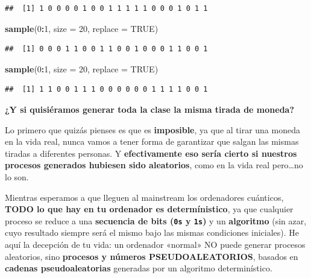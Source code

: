 \documentclass[11pt,]{book}
\newenvironment{Shaded}{\begin{snugshade}}{\end{snugshade}}
\newcommand{\DataTypeTok}[1]{\textcolor[rgb]{0.27,0.27,0.27}{#1}}
\newcommand{\DecValTok}[1]{\textcolor[rgb]{0.06,0.06,0.06}{#1}}
\newcommand{\KeywordTok}[1]{\textcolor[rgb]{0.27,0.27,0.27}{\textbf{#1}}}
\newcommand{\NormalTok}[1]{#1}
\newcommand{\OperatorTok}[1]{\textcolor[rgb]{0.43,0.43,0.43}{\textbf{#1}}}
\newcommand{\OtherTok}[1]{\textcolor[rgb]{0.37,0.37,0.37}{#1}}
\begin{document}
\begin{verbatim}
##  [1] 1 0 0 0 0 1 0 0 1 1 1 1 1 0 0 0 1 0 1 1
\end{verbatim}

\begin{Shaded}
\begin{Highlighting}[]
\KeywordTok{sample}\NormalTok{(}\DecValTok{0}\OperatorTok{:}\DecValTok{1}\NormalTok{, }\DataTypeTok{size =} \DecValTok{20}\NormalTok{, }\DataTypeTok{replace =} \OtherTok{TRUE}\NormalTok{)}
\end{Highlighting}
\end{Shaded}

\begin{verbatim}
##  [1] 0 0 0 1 1 0 0 1 1 0 0 1 0 0 0 1 1 0 0 1
\end{verbatim}

\begin{Shaded}
\begin{Highlighting}[]
\KeywordTok{sample}\NormalTok{(}\DecValTok{0}\OperatorTok{:}\DecValTok{1}\NormalTok{, }\DataTypeTok{size =} \DecValTok{20}\NormalTok{, }\DataTypeTok{replace =} \OtherTok{TRUE}\NormalTok{)}
\end{Highlighting}
\end{Shaded}

\begin{verbatim}
##  [1] 1 1 0 0 1 1 1 0 0 0 0 0 0 1 1 1 1 0 0 1
\end{verbatim}

\textbf{¿Y si quisiéramos generar toda la clase la misma tirada de moneda?}

Lo primero que quizás pienses es que es \textbf{imposible}, ya que al tirar una moneda en la vida real, nunca vamos a tener forma de garantizar que salgan las mismas tiradas a diferentes personas. Y \textbf{efectivamente eso sería cierto si nuestros procesos generados hubiesen sido aleatorios}, como en la vida real pero\ldots{}no lo son.

Mientras esperamos a que lleguen al mainstream los ordenadores cuánticos, \textbf{TODO lo que hay en tu ordenador es determínistico}, ya que cualquier proceso se reduce a una \textbf{secuencia de bits (\texttt{0\textquotesingle{}s} y \texttt{1\textquotesingle{}s})} y un \textbf{algoritmo} (sin azar, cuyo resultado siempre será el mismo bajo las mismas condiciones iniciales). He aquí la decepción de tu vida: un ordenador «normal» NO puede generar procesos aleatorios, sino \textbf{procesos y números PSEUDOALEATORIOS}, basados en \textbf{cadenas pseudoaleatorias} generadas por un algoritmo determinístico.
\end{document}
